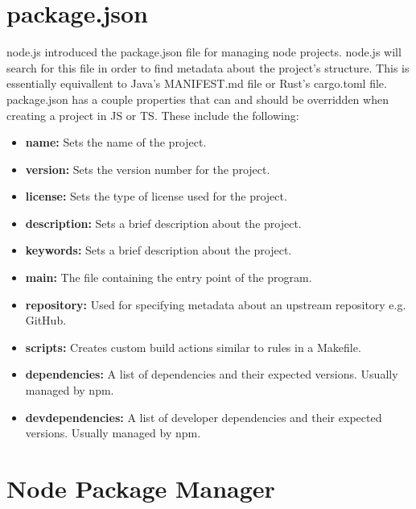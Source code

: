\documentclass{article}
\begin{document}
\section{package.json}

node.js introduced the package.json file for managing node projects. node.js will search for this file in order
to find metadata about the project's structure. This is essentially equivallent to Java's MANIFEST.md file or
Rust's cargo.toml file. package.json has a couple properties that can and should be overridden when creating a
project in JS or TS. These include the following:

\begin{itemize}

\item \textbf{name:} Sets the name of the project.

\item \textbf{version:} Sets the version number for the project.

\item \textbf{license:} Sets the type of license used for the project.

\item \textbf{description:} Sets a brief description about the project.

\item \textbf{keywords:} Sets a brief description about the project.

\item \textbf{main:} The file containing the entry point of the program.

\item \textbf{repository:} Used for specifying metadata about an upstream repository e.g. GitHub.

\item \textbf{scripts:} Creates custom build actions similar to rules in a Makefile.

\item \textbf{dependencies:} A list of dependencies and their expected versions. Usually managed by npm.

\item{%
    \textbf{devdependencies:} A list of developer dependencies and their expected versions. Usually managed by
    npm.
}

\end{itemize}

\section{Node Package Manager}
\end{document}
